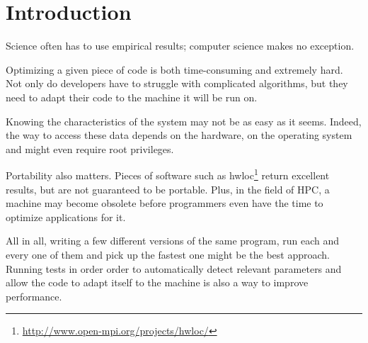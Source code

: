 \section{Introduction}
Science often has to use empirical results; computer science makes no
exception.

Optimizing a given piece of code is both time-consuming and extremely hard. Not
only do developers have to struggle with complicated algorithms, but they need
to adapt their code to the machine it will be run on.

Knowing the characteristics of the system may not be as easy as it seems.
Indeed, the way to access these data depends on the hardware, on the operating
system and might even require root privileges.

Portability also matters. Pieces of software such as
hwloc\footnote{\url{http://www.open-mpi.org/projects/hwloc/}} return excellent
results, but are not guaranteed to be portable. Plus, in the field of HPC, a
machine may become obsolete before programmers even have the time to optimize
applications for it\cite{ATLAS}\cite{Search_BLAS}.

All in all, writing a few different versions of the same program, run each and
every one of them and pick up the fastest one might be the best approach.
Running tests in order order to automatically detect relevant parameters and
allow the code to adapt itself to the machine is also a way to improve
performance.

